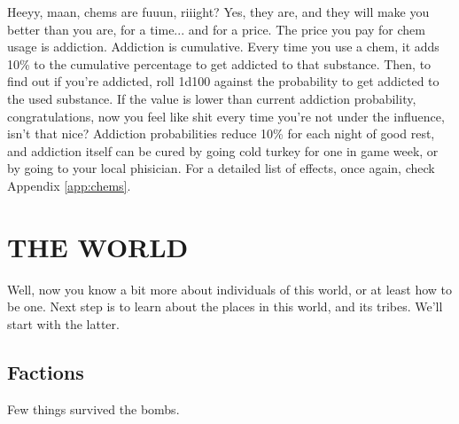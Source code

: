 \documentclass[11pt]{article} %
\begin{document}
Heeyy, maan, chems are fuuun, riiight? Yes, they are, and they will make you better than you are, for a time... and for a price. The price you pay for chem usage is addiction. Addiction is cumulative. Every time you use a chem, it adds 10\% to the cumulative percentage to get addicted to that substance. Then, to find out if you're addicted, roll 1d100 against the probability to get addicted to the used substance. If the value is lower than current addiction probability, congratulations, now you feel like shit every time you're not under the influence, isn't that nice? Addiction probabilities reduce 10\% for each night of good rest, and addiction itself can be cured by going cold turkey for one in game week, or by going to your local phisician. For a detailed list of effects, once again, check Appendix \ref{app:chems}. 

\newpage

\section{THE WORLD}

Well, now you know a bit more about individuals of this world, or at least how to be one. Next step is to learn about the places in this world, and its tribes. We'll start with the latter.

\subsection{Factions}

Few things survived the bombs. 
\end{document}
